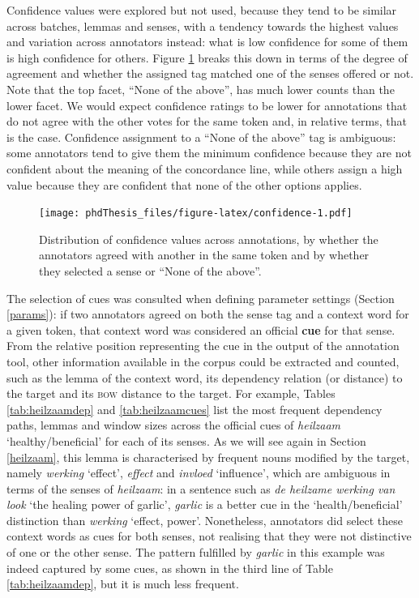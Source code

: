 \documentclass[
]{book}
\begin{document}
Confidence values were explored but not used, because they tend to be similar across batches, lemmas and senses, with a tendency towards the highest values and variation across annotators instead: what is low confidence for some of them is high confidence for others. Figure \ref{fig:confidence} breaks this down in terms of the degree of agreement and whether the assigned tag matched one of the senses offered or not. Note that the top facet, ``None of the above'', has much lower counts than the lower facet. We would expect confidence ratings to be lower for annotations that do not agree with the other votes for the same token and, in relative terms, that is the case. Confidence assignment to a ``None of the above'' tag is ambiguous: some annotators tend to give them the minimum confidence because they are not confident about the meaning of the concordance line, while others assign a high value because they are confident that none of the other options applies.



\begin{figure}
\centering
\texttt{[image: phdThesis\_files/figure-latex/confidence-1.pdf]}
\caption{\label{fig:confidence}Distribution of confidence values across annotations, by whether the annotators agreed with another in the same token and by whether they selected a sense or ``None of the above''.}
\end{figure}

The selection of cues was consulted when defining parameter settings (Section \ref{params}): if two annotators agreed on both the sense tag and a context word for a given token, that context word was considered an official \textbf{cue} for that sense. From the relative position representing the cue in the output of the annotation tool, other information available in the corpus could be extracted and counted, such as the lemma of the context word, its dependency relation (or distance) to the target and its \textsc{bow} distance to the target. For example, Tables \ref{tab:heilzaamdep} and \ref{tab:heilzaamcues} list the most frequent dependency paths, lemmas and window sizes across the official cues of \emph{heilzaam} `healthy/beneficial' for each of its senses. As we will see again in Section \ref{heilzaam}, this lemma is characterised by frequent nouns modified by the target, namely \emph{werking} `effect', \emph{effect} and \emph{invloed} `influence', which are ambiguous in terms of the senses of \emph{heilzaam}: in a sentence such as \emph{de heilzame werking van look} `the healing power of garlic', \emph{garlic} is a better cue in the `health/beneficial' distinction than \emph{werking} `effect, power'. Nonetheless, annotators did select these context words as cues for both senses, not realising that they were not distinctive of one or the other sense. The pattern fulfilled by \emph{garlic} in this example was indeed captured by some cues, as shown in the third line of Table \ref{tab:heilzaamdep}, but it is much less frequent.
\end{document}
